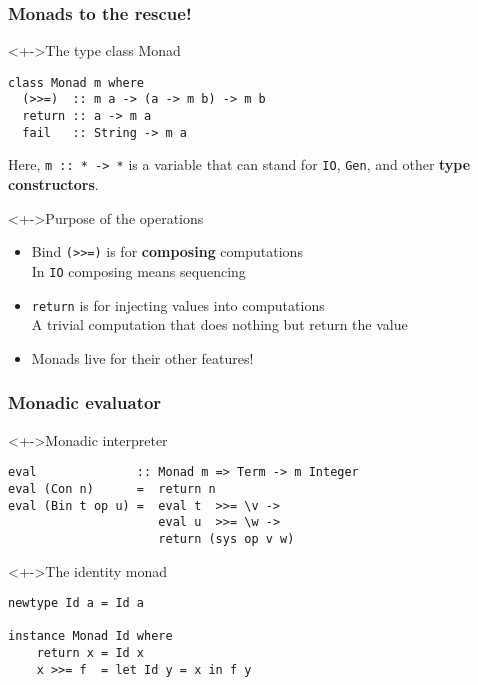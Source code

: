 \documentclass{beamer}
\begin{document}
\begin{frame}[fragile]
  \frametitle{Monads to the rescue!}
\begin{block}<+->{The type class Monad}
\begin{lstlisting}
class Monad m where
  (>>=)  :: m a -> (a -> m b) -> m b
  return :: a -> m a
  fail   :: String -> m a
\end{lstlisting}
  Here, \texttt{m :: * -> *} is a variable that can stand for
  \texttt{IO}, \texttt{Gen}, and other \textbf{type constructors}. 
\end{block}
\begin{block}<+->{Purpose of the operations}
  \begin{itemize}
  \item Bind \lstinline{(>>=)} is for \textbf{composing}
    computations\\
    In \lstinline{IO} composing means sequencing
  \item \lstinline{return} is for injecting values into computations\\
    A trivial computation that does nothing but return the value
  \item Monads live for their other features!
  \end{itemize}
\end{block}
\end{frame}     


\begin{frame}[fragile]
  \frametitle{Monadic evaluator}
\begin{exampleblock}<+->{Monadic interpreter}
\begin{lstlisting}
eval              :: Monad m => Term -> m Integer
eval (Con n)      =  return n
eval (Bin t op u) =  eval t  >>= \v ->
                     eval u  >>= \w ->
                     return (sys op v w)
\end{lstlisting}  
\end{exampleblock}
  \begin{alertblock}<+->{The identity monad}
\begin{lstlisting}
newtype Id a = Id a

instance Monad Id where
    return x = Id x
    x >>= f  = let Id y = x in f y
\end{lstlisting}  
\end{alertblock}

\end{frame}             
\end{document}
